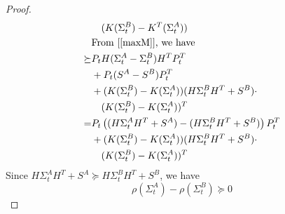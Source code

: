 \documentclass[journal]{IEEEtran}
\begin{document}
\begin{proof}
\begin{equation}
\begin{split}
&\quad(K(\Sigma^B_{t})-K^T(\Sigma^A_{t}))\\
&\text{From [\ref{maxM}], we have}\\
\succeq & P_t H(\Sigma^A_{t}-\Sigma^B_{t})H^T  P^T_t\\
&+P_t (S^A-S^B) P^T_t\\
&+(K(\Sigma^B_{t})-K(\Sigma^A_{t}))(H\Sigma^B_{t}H^T+S^B)\cdot\\
&\quad(K(\Sigma^B_{t})-K(\Sigma^A_{t}))^T\\
= & P_t \left((H\Sigma^A_{t}H^T+S^A)-(H\Sigma^B_{t}H^T+S^B)\right) P^T_t\\
&+(K(\Sigma^B_{t})-K(\Sigma^A_{t}))(H\Sigma^B_{t}H^T+S^B)\cdot\\
&\quad(K(\Sigma^B_{t})-K(\Sigma^A_{t}))^T
\end{split}
\label{inequaility}
\end{equation}
Since $H\Sigma_{t}^AH^T+S^A \succeq H\Sigma_{t}^BH^T+ S^B$, we have
\begin{equation}
\rho(\Sigma^A_{t})-\rho(\Sigma^B_{t}) \succeq 0
\end{equation}
\end{proof}
\end{document}
